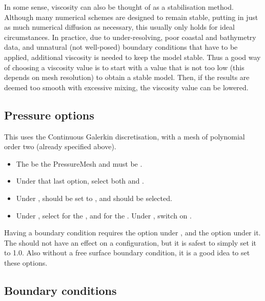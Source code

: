 In some sense, viscosity can also be thought of as a stabilisation method.
Although many numerical schemes are designed to remain stable, putting in just as
much numerical diffusion as necessary, this usually only holds for ideal
circumstances. In practice, due to under-resolving, poor coastal and bathymetry
data, and unnatural (not well-posed) boundary conditions that have to be
applied, additional viscosity is needed to keep the model stable. Thus a good
way of choosing a viscosity value is to start with a value that is not too low
(this depends on mesh resolution) to obtain a stable model. Then, if the results
are deemed too smooth with excessive mixing, the viscosity value can be lowered.

\subsection{Pressure options}
This uses the Continuous Galerkin discretisation, with a mesh of polynomial order two (already specified above).

\begin{itemize}
\item The  be the PressureMesh and  must be .
\item Under that last option, select both 
  and .
\item Under ,  should
  be set to , and 
  should be selected.
\item Under , select  for the
  , and  for the .
  Under , switch on
  .
\end{itemize}

Having a boundary condition  requires the option
 under ,
and the option  under it. The 
should not have an effect on a  configuration, but
it is safest to simply set it to 1.0. Also without a free surface boundary
condition, it is a good idea to set these  options.

\subsection{Boundary conditions}

